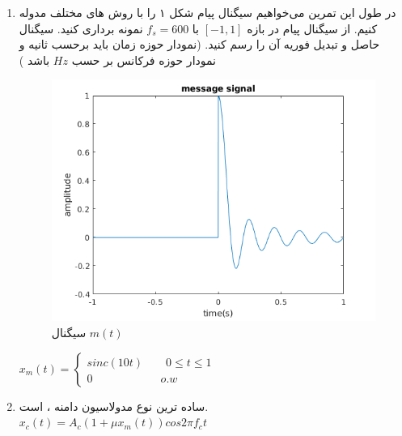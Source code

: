 \documentclass[14pt, professionalfont]{article}
\begin{document}
	
	\begin{enumerate}
		\item 
		در طول این تمرین می‌خواهیم سیگنال پیام شکل ۱ را با روش های مختلف مدوله کنیم. از سیگنال پیام در بازه
		$[-1,1]$
		 با 
		$f_s = 600$
		نمونه برداری کنید. سیگنال حاصل و تبدیل فوریه آن را رسم کنید. (نمودار حوزه زمان باید برحسب ثانیه و نمودار حوزه فرکانس بر حسب 
		$Hz$
		باشد
		)
		
		\begin{minipage}[c]{0.45\textwidth}
				\begin{figure}[H]
				\centering
				\includegraphics[scale = 0.25]{../images/message.png}
				\caption{
					سیگنال
					$m(t)$
				}
			\end{figure}
		\end{minipage}
		\begin{minipage}[c]{0.5\textwidth}
			$x_m(t) = \begin{cases}
				sinc(10t) \qquad 0 \leq t \leq 1\\
				0 \qquad \qquad \qquad o.w
			\end{cases}$
		\end{minipage}
	\item 
	ساده ترین نوع مدولاسیون دامنه ، 
	\:
	\:
	است.
	$x_c(t) = A_c\left(1+ \mu x_m(t)\right)cos 2\pi f_c t\qquad \qquad$
	

\end{enumerate}
\end{document}
